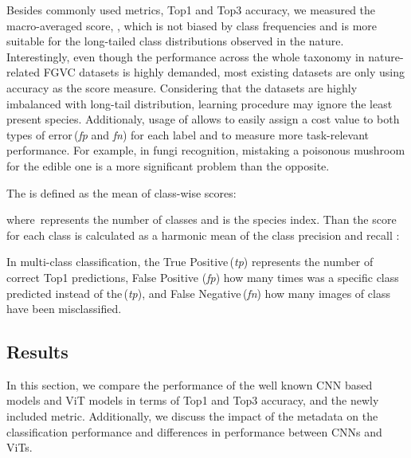 \documentclass[10pt,twocolumn,letterpaper]{article}
\begin{document}
Besides commonly used metrics, Top1 and Top3 accuracy, we measured the macro-averaged  score, , which is not biased by class frequencies and is more suitable for the long-tailed class distributions observed in the nature. Interestingly, even though the performance across the whole taxonomy in nature-related FGVC datasets is highly demanded, most existing datasets are only using accuracy as the score measure. Considering that the datasets are highly imbalanced with long-tail distribution, learning procedure may ignore the least present species. Additionaly, usage of  allows to easily assign a cost value to both types of error\,({\it fp} and {\it fn}) for each label and to measure more task-relevant performance. For example, in fungi recognition, mistaking a poisonous mushroom for the edible one is a more significant problem than the opposite. 

The  is defined as the mean of class-wise  scores:



where\, represents the number of classes and  is the species index. Than the  score for each class is calculated as a harmonic mean of the class precision  and recall :





In multi-class classification, the True Positive\,({\it tp}) represents the number of correct Top1 predictions, False Positive ({\it fp}) how many times was a specific class predicted instead of the\,({\it tp}), and False Negative\,({\it fn}) how many images of class  have been misclassified.





\subsection{Results}
\label{results}

In this section, we compare the performance of the well known CNN based models and ViT models in terms of Top1 and Top3 accuracy, and the newly included  metric. Additionally, we discuss the impact of the metadata on the classification performance and differences in performance between CNNs and ViTs.
\end{document}
